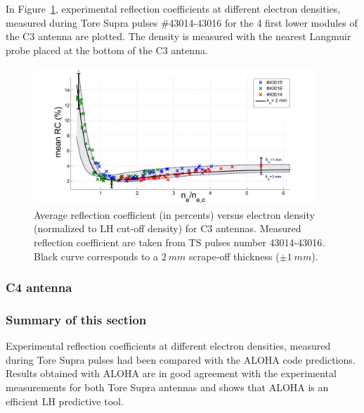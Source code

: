 In Figure~\ref{fig:MarkII_mean_RC}, experimental reflection coefficients at different electron densities, measured during Tore Supra pulses \#43014-43016 for the 4 first lower modules of the C3 antenna are plotted. The density is measured with the nearest Langmuir probe placed at the bottom of the C3 antenna. 

\begin{figure}[h]
	\centering
	\includegraphics[width=0.95\textwidth]{figures/chap2/Tore_Supra/C3_mean_lowerMod}
	\caption{Average reflection  coefficient (in percents) versus electron density (normalized to LH cut-off density) for C3 antennas. Measured reflection  coefficient are taken from TS pulses number 43014-43016. Black curve corresponds to a $2~mm$ scrape-off thickness ($\pm 1~mm$).}
	\label{fig:MarkII_mean_RC}
\end{figure}




\subsubsection{C4 antenna}

\subsubsection{Summary of this section}

Experimental reflection coefficients at different electron densities, measured during Tore Supra pulses had been compared with the ALOHA code predictions. Results obtained with ALOHA are in good agreement with the experimental measurements for both Tore Supra antennas and shows that ALOHA is an efficient LH predictive tool. 


